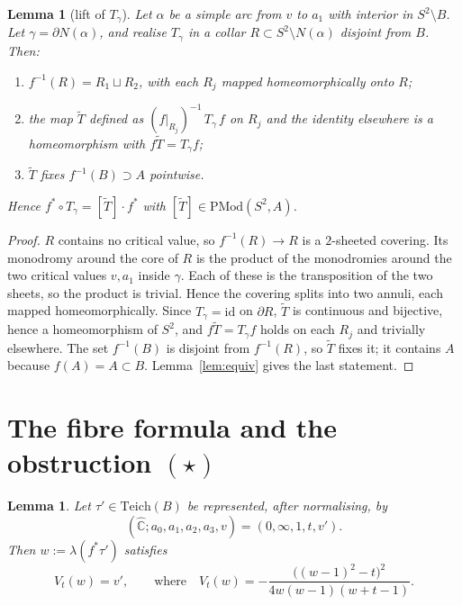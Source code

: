 \documentclass[11pt]{article}
\newtheorem{lemma}[proposition]{Lemma}
\theoremstyle{definition}
\newcommand{\Teich}{\mathrm{Teich}}
\newcommand{\PMod}{\mathrm{PMod}}
\newcommand{\Ch}{\hat{\mathbb C}}
\begin{document}
\begin{lemma}[lift of $T_\gamma$]\label{lem:lift}
Let $\alpha$ be a simple arc from $v$ to $a_1$ with interior in $S^2\setminus B$. Let $\gamma=\partial N(\alpha)$, and realise $T_\gamma$ in a collar $R\subset S^2\setminus N(\alpha)$ disjoint from $B$. Then:
\begin{enumerate}[label=\textup{(\roman*)},nosep]
\item $f^{-1}(R)=R_1\sqcup R_2$, with each $R_j$ mapped homeomorphically onto $R$;
\item the map $\tilde T$ defined as $(f|_{R_j})^{-1}\,T_\gamma\, f$ on $R_j$ and the identity elsewhere is a homeomorphism with $f\tilde T=T_\gamma f$;
\item $\tilde T$ fixes $f^{-1}(B)\supset A$ pointwise.
\end{enumerate}
Hence $f^*\circ T_\gamma=[\tilde T]\cdot f^*$ with $[\tilde T]\in\PMod(S^2,A)$.
\end{lemma}

\begin{proof}
$R$ contains no critical value, so $f^{-1}(R)\to R$ is a $2$-sheeted covering. Its monodromy around the core of $R$ is the product of the monodromies around the two critical values $v,a_1$ inside $\gamma$. Each of these is the transposition of the two sheets, so the product is trivial. Hence the covering splits into two annuli, each mapped homeomorphically. Since $T_\gamma=\mathrm{id}$ on $\partial R$, $\tilde T$ is continuous and bijective, hence a homeomorphism of $S^2$, and $f\tilde T=T_\gamma f$ holds on each $R_j$ and trivially elsewhere. The set $f^{-1}(B)$ is disjoint from $f^{-1}(R)$, so $\tilde T$ fixes it; it contains $A$ because $f(A)=A\subset B$. Lemma~\ref{lem:equiv} gives the last statement.
\end{proof}

\section{The fibre formula and the obstruction \texorpdfstring{$(\star)$}{(*)}}

\begin{lemma}\label{lem:fibreformula}
Let $\tau'\in\Teich(B)$ be represented, after normalising, by
\[(\Ch;a_0,a_1,a_2,a_3,v)=(0,\infty,1,t,v').\] Then $w:=\lambda(f^*\tau')$ satisfies
\[V_t(w)=v',\qquad\text{where}\quad V_t(w)=-\frac{\bigl((w-1)^2-t\bigr)^2}{4w(w-1)(w+t-1)} .\]
\end{lemma}
\end{document}
